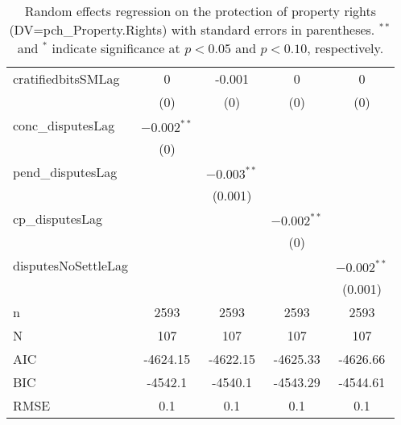 \begin{table}[ht]
\begin{tabular}{lcccc}
  cratifiedbitsSMLag & 0 & -0.001 & 0 & 0 \\ 
   & (0) & (0) & (0) & (0) \\ 
  conc\_disputesLag & $-0.002^{\ast\ast}$ &  &  &  \\ 
   & (0) &  &  &  \\ 
  pend\_disputesLag &  & $-0.003^{\ast\ast}$ &  &  \\ 
   &  & (0.001) &  &  \\ 
  cp\_disputesLag &  &  & $-0.002^{\ast\ast}$ &  \\ 
   &  &  & (0) &  \\ 
  disputesNoSettleLag &  &  &  & $-0.002^{\ast\ast}$ \\ 
   &  &  &  & (0.001) \\ 
   \hline
n & 2593 & 2593 & 2593 & 2593 \\ 
  N & 107 & 107 & 107 & 107 \\ 
  AIC & -4624.15 & -4622.15 & -4625.33 & -4626.66 \\ 
  BIC & -4542.1 & -4540.1 & -4543.29 & -4544.61 \\ 
  RMSE & 0.1 & 0.1 & 0.1 & 0.1 \\ 
   \hline
\hline
\end{tabular}
\caption{Random effects regression on the protection of property rights (DV=pch\_Property.Rights) with standard errors in parentheses. $^{**}$ and $^{*}$ indicate significance at $p< 0.05 $ and $p< 0.10 $, respectively.} 
\end{table}
